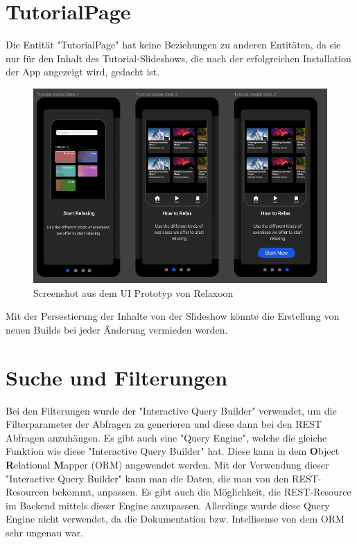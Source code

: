 \section{TutorialPage}
Die Entität "TutorialPage" hat keine Beziehungen zu anderen Entitäten, da sie nur für den Inhalt des Tutorial-Slideshows,
die nach der erfolgreichen Installation der App angezeigt wird, gedacht ist.

\begin{figure}[H]
    \centering
    \includegraphics[height=0.5\textwidth]{./pics/slideshow.png}
    \caption{Screenshot aus dem UI Prototyp von Relaxoon}
\end{figure}

Mit der Persestierung der Inhalte von der Slideshow könnte die Erstellung
von neuen Builds bei jeder Änderung vermieden werden.


\section{Suche und Filterungen}

Bei den Filterungen wurde der "Interactive Query Builder" verwendet,
um die Filterparameter der Abfragen zu generieren
und diese dann bei den REST Abfragen anzuhängen.
Es gibt auch eine "Query Engine", welche die gleiche Funktion wie diese
"Interactive Query Builder" hat.
Diese kann in dem \textbf{O}bject \textbf{R}elational \textbf{M}apper (ORM) angewendet werden.
Mit der Verwendung dieser "Interactive Query Builder" kann man die Daten,
die man von den REST-Resourcen bekommt, anpassen.
Es gibt auch die Möglichkeit, die REST-Resource im Backend mittels dieser
Engine anzupassen.
Allerdings wurde diese Query Engine nicht verwendet,
da die Dokumentation bzw. Intellisense von dem ORM sehr ungenau war.

